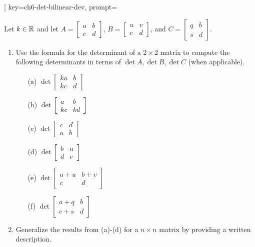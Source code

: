 
\begin{SaveQuestion}[
        key=ch6-det-bilinear-dev,
        prompt={Let $k\in\mathbb{R}$ and let $A=\begin{bmatrix} a & b \\ c & d \end{bmatrix}$, $B=\begin{bmatrix} u & v \\ c & d \end{bmatrix}$, and $C=\begin{bmatrix} q & b \\ s & d \end{bmatrix}$.
        \begin{enumerate}
        \item Use the formula for the determinant of a $2\times 2$ matrix to compute the following determinants in terms of $\det A, \det B, \det C$ (when applicable).  
        \begin{enumerate}
        \item[(a)] $\det\begin{bmatrix} ka & b \\ kc & d \end{bmatrix}$ 
        \item[(b)] $\det\begin{bmatrix} a & b \\ kc & kd \end{bmatrix}$ 
        \item[(c)] $\det\begin{bmatrix} c & d \\ a & b \end{bmatrix}$ 
        \item[(d)] $\det\begin{bmatrix} b & a \\ d & c \end{bmatrix}$ 
        \item[(e)] $\det\begin{bmatrix} a+u & b+v \\ c & d \end{bmatrix}$
        \item[(f)] $\det\begin{bmatrix} a+q & b \\ c+s & d \end{bmatrix}$
        \end{enumerate}
        \item Generalize the results from (a)-(d) for a $n \times n$ matrix by providing a written description. 

\end{enumerate}}
\end{SaveQuestion}
